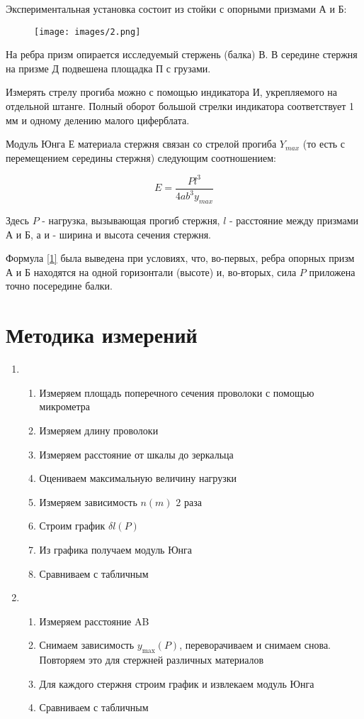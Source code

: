\documentclass[a4paper,12pt]{article} %
\begin{document}
Экспериментальная установка состоит из стойки с опорными призмами А и Б:

\begin{figure}[H]
    \centering
    \texttt{[image: images/2.png]}
\end{figure}

На ребра призм опирается исследуемый стержень (балка) В. В середине стержня на призме Д подвешена площадка П с грузами. 

Измерять стрелу прогиба можно с помощью индикатора И, укрепляемого на отдельной штанге. Полный оборот большой стрелки индикатора соответствует 1 мм и одному делению малого циферблата.

Модуль Юнга Е материала стержня связан со стрелой прогиба $Y_{max}$ (то есть с перемещением середины стержня) следующим соотношением:

\begin{equation} \label{1}
    E = \frac {Pl^3}{4ab^3y_{max}}
\end{equation}

Здесь $ P $  - нагрузка, вызывающая прогиб стержня, $ l $  - расстояние между призмами А и Б, а и - ширина и высота сечения стержня.

Формула \eqref{1} была выведена при условиях, что, во-первых, ребра опорных призм А и Б находятся на одной горизонтали (высоте) и, во-вторых, сила $ P $  приложена точно посередине балки.

\section{Методика измерений}
\begin{enumerate}
    \item \begin{enumerate}
        \item Измеряем площадь поперечного сечения проволоки с помощью микрометра
        \item Измеряем длину проволоки 
        \item Измеряем расстояние от шкалы до зеркальца
        \item Оцениваем максимальную величину нагрузки
        \item Измеряем зависимость $ n(m) $ 2 раза
        \item Строим график $\delta l (P)$
        \item  Из графика получаем модуль Юнга
        \item Сравниваем с табличным
    \end{enumerate}
    \item \begin{enumerate}
        \item Измеряем расстояние AB
        \item Снимаем зависимость $ y_{\max}(P)$, переворачиваем и снимаем снова. Повторяем это для стержней различных материалов
        \item Для каждого стержня строим график и извлекаем модуль Юнга
        \item Сравниваем с табличным
    \end{enumerate}
\end{enumerate}
\end{document}
